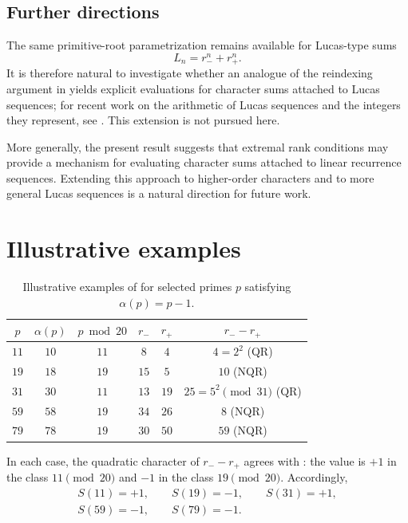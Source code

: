 \documentclass[preprint,12pt]{elsarticle}
\numberwithin{equation}{section}
\theoremstyle{plain}
\theoremstyle{definition}
\begin{document}
\subsection*{Further directions}
 
The same primitive-root parametrization remains available for Lucas-type sums
\[
L_n=r_-^n+r_+^n.
\]
It is therefore natural to investigate whether an analogue of the
reindexing argument in  yields
explicit evaluations for character sums attached to Lucas sequences;
for recent work on the arithmetic of Lucas sequences and the integers
they represent, see \cite{HajduTijdeman2025}.
This extension is not pursued here.
 
More generally, the present result suggests that extremal rank
conditions may provide a mechanism for evaluating character sums
attached to linear recurrence sequences. Extending this approach to
higher-order characters and to more general Lucas sequences is a
natural direction for future work.
 
\appendix
 
\section{Illustrative examples}\label{app:examples}
 
\begin{table}[ht]
\centering
\caption{Illustrative examples of  for selected
primes $p$ satisfying $\alpha(p)=p-1$.}
\label{tab:examples}
\small
\begin{tabular}{@{}cccccc@{}}
\toprule
$p$ & $\alpha(p)$ & $p\bmod 20$ & $r_-$ & $r_+$ & $r_--r_+$\\
\midrule
$11$ & $10$ & $11$ & $8$ & $4$ & $4=2^2$ (QR)\\
$19$ & $18$ & $19$ & $15$ & $5$ & $10$ (NQR)\\
$31$ & $30$ & $11$ & $13$ & $19$ & $25=5^2\pmod{31}$ (QR)\\
$59$ & $58$ & $19$ & $34$ & $26$ & $8$ (NQR)\\
$79$ & $78$ & $19$ & $30$ & $50$ & $59$ (NQR)\\
\bottomrule
\end{tabular}
\end{table}
 
In each case, the quadratic character of $r_--r_+$ agrees with
: the value is $+1$ in the class $11\pmod{20}$ and
$-1$ in the class $19\pmod{20}$. Accordingly,
\begin{gather*}
S(11)=+1,\qquad S(19)=-1,\qquad S(31)=+1, \\
S(59)=-1,\qquad S(79)=-1.
\end{gather*}
 
\end{document}

